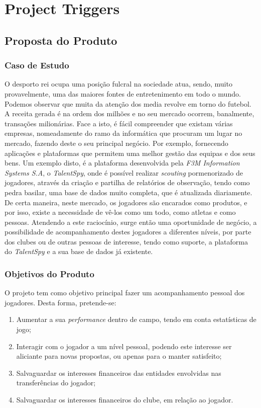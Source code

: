 \chapter{Project Triggers}

\section{Proposta do Produto}

\subsection{Caso de Estudo}

O desporto rei ocupa uma posição fulcral na sociedade atua, sendo, muito provavelmente, uma das maiores fontes de entretenimento em todo o mundo. Podemos observar que muita da atenção dos media revolve em torno do futebol. A receita gerada é na ordem dos milhões e no seu mercado ocorrem, banalmente, transações milionárias. Face a isto, é fácil compreender que existam várias empresas, nomeadamente do ramo da informática que procuram um lugar no mercado, fazendo deste o seu principal negócio. Por exemplo, fornecendo aplicações e plataformas que permitem uma melhor gestão das equipas e dos seus bens. Um exemplo disto, é a plataforma desenvolvida pela \emph{F3M Information Systems S.A}, o \emph{TalentSpy}, onde é possível realizar \emph{scouting} pormenorizado de jogadores, através da criação e partilha de relatórios de observação, tendo como pedra basilar, uma base de dados muito completa, que é atualizada diariamente. 
De certa maneira, neste mercado, os jogadores são encarados como produtos, e por isso, existe a necessidade de vê-los como um todo, como atletas e como pessoas. Atendendo a este raciocínio, surge então uma oportunidade de negócio, a possibilidade de acompanhamento destes jogadores a diferentes níveis, por parte dos clubes ou de outras pessoas de interesse, tendo como suporte, a plataforma do \emph{TalentSpy} e a sua base de dados já existente.

\subsection{Objetivos do Produto}

O projeto tem como objetivo principal fazer um acompanhamento pessoal dos jogadores. Desta forma, pretende-se:
\begin{enumerate}
\item Aumentar a sua \emph{performance} dentro de campo, tendo em conta estatísticas de jogo;
\item Interagir com o jogador a um nível pessoal, podendo este interesse ser aliciante para novas propostas, ou apenas para o manter satisfeito;
\item Salvaguardar os interesses financeiros das entidades envolvidas nas transferências do jogador;
\item Salvaguardar os interesses financeiros do clube, em relação ao jogador.
\end{enumerate}

